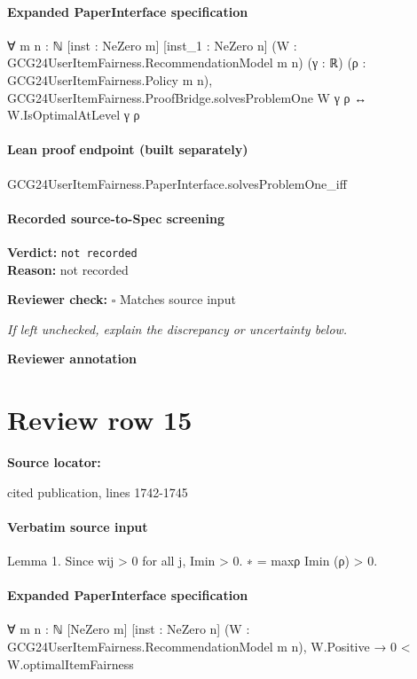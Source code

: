 \documentclass[10pt]{article}
\newcommand{\reviewerbox}{%
  \par\noindent\fbox{\parbox{0.96\linewidth}{\rule{0pt}{0.38in}}}\par
}
\newcommand{\reviewmatch}[1]{%
  \par\noindent\textbf{Reviewer check:} $\square$\; #1\par
  \noindent\emph{If left unchecked, explain the discrepancy or uncertainty below.}\par
}
\begin{document}
\paragraph{Expanded PaperInterface specification}
\begin{ReviewVerbatim}
∀ {m n : ℕ} [inst : NeZero m] [inst_1 : NeZero n] (W : GCG24UserItemFairness.RecommendationModel m n) (γ : ℝ)
  (ρ : GCG24UserItemFairness.Policy m n),
  GCG24UserItemFairness.ProofBridge.solvesProblemOne W γ ρ ↔ W.IsOptimalAtLevel γ ρ
\end{ReviewVerbatim}

\paragraph{Lean proof endpoint (built separately)}\begin{ReviewVerbatim}
GCG24UserItemFairness.PaperInterface.solvesProblemOne_iff
\end{ReviewVerbatim}

\paragraph{Recorded source-to-Spec screening}
\textbf{Verdict:} \texttt{not recorded}
\\
\textbf{Reason:} not recorded
\reviewmatch{Matches source input}
\noindent\textbf{Reviewer annotation}\par
\reviewerbox
\clearpage
\hypertarget{source-claim-9c3a977985663e10}{}
\section*{Review row 15}
\textbf{Source locator:} {\footnotesize\raggedright cited publication, lines 1742-\allowbreak{}1745\par}
\paragraph{Verbatim source input}
\begin{ReviewVerbatim}
Lemma 1. Since wij > 0 for all j, Imin
> 0.
∗
= maxρ Imin (ρ) > 0.
\end{ReviewVerbatim}


\paragraph{Expanded PaperInterface specification}
\begin{ReviewVerbatim}
∀ {m n : ℕ} [NeZero m] [inst : NeZero n] (W : GCG24UserItemFairness.RecommendationModel m n),
  W.Positive → 0 < W.optimalItemFairness
\end{ReviewVerbatim}
\end{document}
